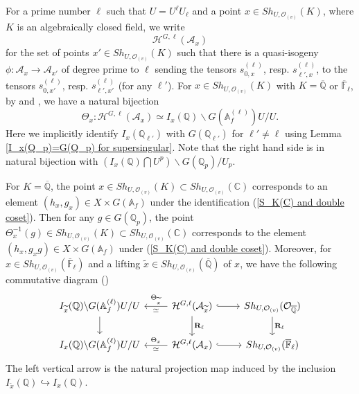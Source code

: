 \documentclass[11pt,oneside,reqno]{amsart}
\newcommand{\A}{\mathbb{A}}
\newcommand{\C}{\mathbb{C}}
\newcommand{\F}{\mathbb{F}}
\newcommand{\Q}{\mathbb{Q}}
\newcommand{\Acal}{\mathcal{A}}
\newcommand{\Hcal}{\mathcal{H}}
\newcommand{\Ocal}{\mathcal{O}}
\newcommand{\Rbf}{\mathbf{R}}
\theoremstyle{plain}
\begin{document}
	
	
	
	
	
	
	
	For a prime number $\ell$ such that $U=U^\ell U_\ell$ and a point $x\in Sh_{U,\Ocal_{(v)}}(K)$, where $K$ is an algebraically closed field, we write
	\[
	\Hcal^{G,\ell}(\Acal_x)
	\]
	for the set of points $x'\in Sh_{U,\Ocal_{(v)}}(K)$ such that there is a quasi-isogeny $\phi\colon\Acal_x\to\Acal_{x'}$ of degree prime to $\ell$ sending the tensors $s^{(\ell)}_{0,x}$, resp. $s^{(\ell)}_{\ell',x}$, to the tensors $s^{(\ell)}_{0,x'}$, resp. $s^{(\ell)}_{\ell',x'}$ (for any $\ell'$). For $x\in Sh_{U,\Ocal_{(v)}}(K)$ with $K=\overline{\Q}$ or $\overline{\F}_\ell$, by \cite[(1) \& (2)]{Zhang2025} and \cite[Corollary 1.4.2 \& Propositions 2.1.3, 2.1.5]{Kisin2017}, we have a natural bijection
	\[
	\Theta_x\colon
	\Hcal^{G,\ell}(\Acal_x)
	\simeq
	I_x(\Q)\backslash G(\A_f^{(\ell)})U/U.
	\]
	Here we implicitly identify $I_x(\Q_{\ell'})$ with $G(\Q_{\ell'})$ for $\ell'\neq\ell$ using Lemma \ref{I_x(Q_p)=G(Q_p) for supersingular}.
	Note that the right hand side is in natural bijection with $(I_x(\Q)\bigcap U^p)\backslash G(\Q_p)/U_p$.
	
	
	
	For $K=\overline{\Q}$, the point $x\in Sh_{U,\Ocal_{(v)}}(K)\subset Sh_{U,\Ocal_{(v)}}(\C)$ corresponds to an element $(h_x,g_x)\in X\times G(\A_f)$ under the identification (\ref{S_K(C) and double coset}). Then for any $g\in G(\Q_p)$, the point $\Theta_x^{-1}(g)\in Sh_{U,\Ocal_{(v)}}(K)\subset Sh_{U,\Ocal_{(v)}}(\C)$ corresponds to the element $(h_x,g_xg)\in X\times G(\A_f)$ under (\ref{S_K(C) and double coset}). Moreover, for $x\in Sh_{U,\Ocal_{(v)}}(\overline{\F}_\ell)$ and a lifting $\widetilde{x}\in Sh_{U,\Ocal_{(v)}}(\overline{\Q})$ of $x$, we have the following commutative diagram (\cite[Corollary 1.4.12]{Kisin2017})
	\begin{equation}\label{commutative diagram for I_x and I_{widetilde{x}}}
		\begin{tikzcd}
			I_{\widetilde{x}}(\Q)\backslash G(\A_f^{(\ell)})U/U
			\arrow[d]
			&
			\Hcal^{G,\ell}(\Acal_{\widetilde{x}})
			\arrow[l,"\Theta_{\widetilde{x}}"',"\simeq"]
			\arrow[r,hookrightarrow]
			\arrow[d,"\Rbf_\ell"]
			&
			Sh_{U,\Ocal_{(v)}}(\Ocal_{\overline{\Q}})
			\arrow[d,"\Rbf_\ell"]
			\\
			I_x(\Q)\backslash G(\A_f^{(\ell)})U/U
			&
			\Hcal^{G,\ell}(\Acal_x)
			\arrow[l,"\Theta_x"',"\simeq"]
			\arrow[r,hookrightarrow]
			&
			Sh_{U,\Ocal_{(v)}}(\overline{\F}_\ell)
		\end{tikzcd}
	\end{equation}
	The left vertical arrow is the natural projection map induced by the inclusion $I_{\widetilde{x}}(\Q)\hookrightarrow I_x(\Q)$.
	
\end{document}
